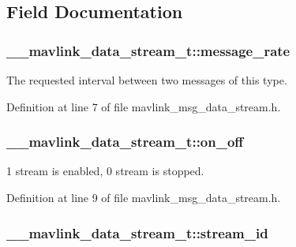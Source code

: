 \subsection{Field Documentation}
\hypertarget{struct____mavlink__data__stream__t_a351a00b81ef679d4fa73048257494bbc}{
\subsubsection[{message\-\_\-rate}]{ \-\_\-\-\_\-mavlink\-\_\-data\-\_\-stream\-\_\-t\-::message\-\_\-rate}}\label{struct____mavlink__data__stream__t_a351a00b81ef679d4fa73048257494bbc}


The requested interval between two messages of this type. 



Definition at line 7 of file mavlink\-\_\-msg\-\_\-data\-\_\-stream.\-h.

\hypertarget{struct____mavlink__data__stream__t_ae0ec7bd3a3fd38496e2a6aaa3b39daca}{
\subsubsection[{on\-\_\-off}]{ \-\_\-\-\_\-mavlink\-\_\-data\-\_\-stream\-\_\-t\-::on\-\_\-off}}\label{struct____mavlink__data__stream__t_ae0ec7bd3a3fd38496e2a6aaa3b39daca}


1 stream is enabled, 0 stream is stopped. 



Definition at line 9 of file mavlink\-\_\-msg\-\_\-data\-\_\-stream.\-h.

\hypertarget{struct____mavlink__data__stream__t_aaac4584f5e5677fe70edee1c53565b53}{
\subsubsection[{stream\-\_\-id}]{ \-\_\-\-\_\-mavlink\-\_\-data\-\_\-stream\-\_\-t\-::stream\-\_\-id}}\label{struct____mavlink__data__stream__t_aaac4584f5e5677fe70edee1c53565b53}


